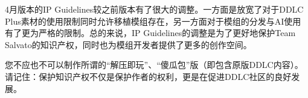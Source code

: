 \documentclass[../../Main.tex]{subfiles}
\begin{document}
4月版本的IP Guidelines较之前版本有了很大的调整。一方面是放宽了对于DDLC Plus素材的使用限制同时允许移植模组存在，另一方面对于模组的分发与AI使用有了更为严格的限制。总的来说，IP Guidelines的调整是为了更好地保护Team Salvato的知识产权，同时也为模组开发者提供了更多的创作空间。

您不应也不可以制作所谓的“解压即玩”、“傻瓜包”版（即包含原版DDLC内容）。请记住：保护知识产权不仅是保护作者的权利，更是在促进DDLC社区的良好发展。
\end{document}
